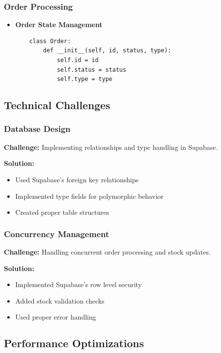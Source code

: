 \documentclass[12pt,a4paper]{article}
\begin{document}
\subsubsection{Order Processing}
\begin{itemize}
    \item \textbf{Order State Management}
    \begin{verbatim}
    class Order:
        def __init__(self, id, status, type):
            self.id = id
            self.status = status
            self.type = type
    \end{verbatim}
\end{itemize}

\subsection{Technical Challenges}

\subsubsection{Database Design}
\textbf{Challenge:} Implementing relationships and type handling in Supabase.

\textbf{Solution:}
\begin{itemize}
    \item Used Supabase's foreign key relationships
    \item Implemented type fields for polymorphic behavior
    \item Created proper table structures
\end{itemize}

\subsubsection{Concurrency Management}
\textbf{Challenge:} Handling concurrent order processing and stock updates.

\textbf{Solution:}
\begin{itemize}
    \item Implemented Supabase's row level security
    \item Added stock validation checks
    \item Used proper error handling
\end{itemize}

\subsection{Performance Optimizations}
\end{document}
